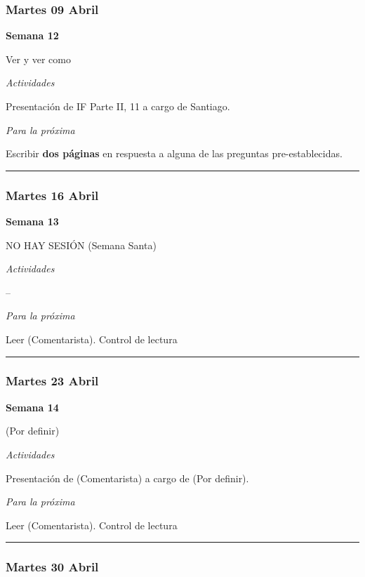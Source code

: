 \documentclass[spanish,]{article}
\begin{document}
\subsubsection{Martes 09 Abril}\label{martes-09-abril}

\textbf{Semana 12}

Ver y ver como

\emph{Actividades}

Presentación de IF Parte II, 11 a cargo de Santiago.

\emph{Para la próxima}

Escribir \textbf{dos páginas} en respuesta a alguna de las preguntas
pre-establecidas.

\begin{center}\rule{0.5\linewidth}{\linethickness}\end{center}

\subsubsection{Martes 16 Abril}\label{martes-16-abril}

\textbf{Semana 13}

NO HAY SESIÓN (Semana Santa)

\emph{Actividades}

--

\emph{Para la próxima}

Leer (Comentarista). Control de lectura

\begin{center}\rule{0.5\linewidth}{\linethickness}\end{center}

\subsubsection{Martes 23 Abril}\label{martes-23-abril}

\textbf{Semana 14}

(Por definir)

\emph{Actividades}

Presentación de (Comentarista) a cargo de (Por definir).

\emph{Para la próxima}

Leer (Comentarista). Control de lectura

\begin{center}\rule{0.5\linewidth}{\linethickness}\end{center}

\subsubsection{Martes 30 Abril}\label{martes-30-abril}
\end{document}
